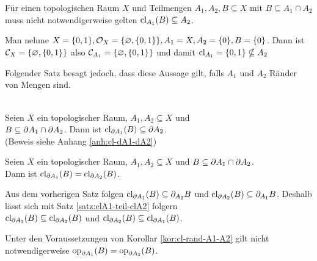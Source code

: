     Für einen topologischen Raum $X$ und Teilmengen $A_1, A_2, B \subseteq X$ mit $B \subseteq A_1 \cap A_2$ muss nicht notwendigerweise gelten $\text{cl}_{A_1}(B) \subseteq A_2$.
    \begin{gegenbsp}
        Man nehme $X = \{0,1\}, \mathcal{O}_X = \{\varnothing, \{0,1\}\}, A_1 = X, A_2 = \{0\}, B = \{0\}$. Dann ist $\mathcal{C}_X = \{\varnothing, \{0,1\}\}$ also $\mathcal{C}_{A_1} = \{\varnothing, \{0,1\}\}$ und damit $\text{cl}_{A_1} = \{0,1\} \nsubseteq A_2$
    \end{gegenbsp}
    Folgender Satz besagt jedoch, dass diese Aussage gilt, falls $A_1$ und $A_2$ Ränder von Mengen sind.
    \begin{satz}\label{satz:cl-dA1-dA2}\ \\
        Seien $X$ ein topologischer Raum, $A_1, A_2 \subseteq X$ und \\
        $B \subseteq \partial A_1 \cap \partial A_2$.
        Dann ist $\text{cl}_{\partial A_1}(B) \subseteq \partial A_2$.\\
        (Beweis siehe Anhang \ref{anh:cl-dA1-dA2})
    \end{satz}


    \begin{kor}\label{kor:cl-rand-A1-A2}
        Seien $X$ ein topologischer Raum, $A_1, A_2 \subseteq X$ und $B \subseteq \partial A_1 \cap \partial A_2$.\\
        Dann ist ${\text{cl}_{\partial A_1}(B) = \text{cl}_{\partial A_2}(B)}$.
    \end{kor}
    \begin{bew}
        Aus dem vorherigen Satz folgen $\text{cl}_{\partial A_1}(B) \subseteq \partial_{A_2}B$ und $\text{cl}_{\partial A_2}(B) \subseteq \partial_{A_1}B$. Deshalb lässt sich mit Satz \ref{satz:clA1-teil-clA2} folgern \\
        ${\text{cl}_{\partial A_1}(B) \subseteq \text{cl}_{\partial A_2}(B)}$ und ${\text{cl}_{\partial A_2}(B) \subseteq \text{cl}_{\partial A_1}(B)}$.
    \end{bew}

    Unter den Voraussetzungen von Korollar \ref{kor:cl-rand-A1-A2} gilt nicht notwendigerweise ${\text{op}_{\partial A_1}(B) = \text{op}_{\partial A_2}(B)}$.
    
